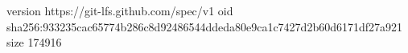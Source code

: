 version https://git-lfs.github.com/spec/v1
oid sha256:933235cac65774b286c8d92486544ddeda80e9ca1c7427d2b60d6171df27a921
size 174916
